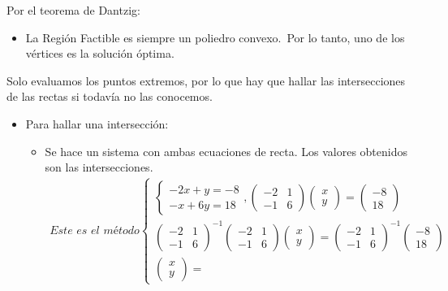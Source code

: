\documentclass[12pt, twoside, openright]{report} %
\begin{document}
	  Por el teorema de Dantzig:

      \begin{itemize}
    
      \item
        La Región Factible es siempre un poliedro convexo.~Por lo tanto,
        uno de los vértices es la solución óptima.
      \end{itemize}

	  Solo evaluamos los puntos extremos, por lo que hay que hallar las
      intersecciones de las rectas si todavía no las conocemos.
	  \begin{itemize}
		  \item Para hallar una intersección: 
		  \begin{itemize}
			  \item Se hace un sistema con ambas
			  ecuaciones de recta. Los valores obtenidos son las intersecciones.
			  \begin{eqnarray*}
				\textit{Este es el método}\left\{\begin{matrix}
					\left\{\begin{matrix}
					-2x+y=-8\\ 
					-x+6y=18
					\end{matrix}\right.
					,
					\begin{pmatrix}
					-2 & 1 \\ 
					-1 & 6
					\end{pmatrix}
					\begin{pmatrix}
					x \\ 
					y
					\end{pmatrix}
					=
					\begin{pmatrix}
					-8 \\ 
					18
					\end{pmatrix}\\ 
					\begin{pmatrix}
					-2 & 1 \\ 
					-1 & 6
					\end{pmatrix}^{-1}
					\begin{pmatrix}
					-2 & 1 \\ 
					-1 & 6
					\end{pmatrix}
					\begin{pmatrix}
					x \\ 
					y
					\end{pmatrix}
					=
					\begin{pmatrix}
					-2 & 1 \\ 
					-1 & 6
					\end{pmatrix}^{-1}
					\begin{pmatrix}
					-8 \\ 
					18
					\end{pmatrix}\\ 
					\begin{pmatrix}
					x \\ 
					y
					\end{pmatrix}
					=
					

\end{matrix}
\end{eqnarray*}
\end{itemize}
\end{itemize}
\end{document}
